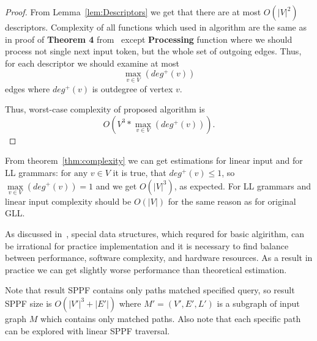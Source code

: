 \begin{proof}

From Lemma~\ref{lem:Descriptors} we get that there are at most $O(|V|^2)$ descriptors. 
Complexity of all functions which used in algorithm are the same as in proof of \textbf{Theorem 4} from~\cite{gllParsingTree} except \textbf{Processing} function where we should process not single next input token, but the whole set of outgoing edges.
Thus, for each descriptor we should examine at most $$\max\limits_{v \in V}\left(deg^+\left(v\right)\right)$$ edges where $deg^+(v)$ is outdegree of vertex $v$.

Thus, worst-case complexity of proposed algorithm is $$O\left(V^3*\max\limits_{v \in V}\left(deg^+\left(v\right)\right)\right).$$
\end{proof}


From theorem~\ref{thm:complexity} we can get estimations for linear input and for LL grammars: $\text{for any } v \in V$ it is true, that $deg^+(v) \leq 1$, so $\max\limits_{v \in V}(deg^+(v))  = 1 $ and we get $O(|V|^3)$, as expected. 
For LL grammars and linear input complexity should be $O(|V|)$ for the same reason as for original GLL.
 

As discussed in~\cite{modellingGLL}, special data structures, which requred for basic algirithm, can be irrational for practice implementation and it is necessary to find balance between performance, software complexity, and hardware resources.
As a result in practice we can get slightly worse performance than theoretical estimation.

Note that result SPPF contains only paths matched specified query, so result SPPF size is $O(|V'|^3 + |E'|)$ where $M'=(V',E',L')$ is a subgraph of input graph $M$ which contains only matched paths.
Also note that each specific path can be explored with linear SPPF traversal. 
